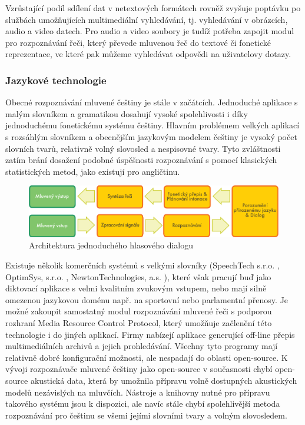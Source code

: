 \begin{multicols}{2}
Vzrůstající podíl sdílení dat v netextových formátech rovněž zvyšuje poptávku po službách umožňujících multimediální vyhledávání, tj. vyhledávání v obrázcích, audio a video datech. Pro audio a video soubory je tudíž potřeba zapojit modul pro rozpoznávání řeči, který převede mluvenou řeč do textové či fonetické reprezentace, ve které pak můžeme vyhledávat odpovědi na uživatelovy dotazy.

\subsubsection{Jazykové technologie}

Obecné rozpoznávání mluvené češtiny je stále v začátcích. Jednoduché aplikace s malým slovníkem a gramatikou dosahují vysoké spolehlivosti i díky jednoduchému fonetickému systému češtiny. Hlavním problémem velkých aplikací s rozsáhlým slovníkem a obecnějším jazykovým modelem češtiny je vysoký počet slovních tvarů, relativně volný slovosled a nespisovné tvary. Tyto zvláštnosti zatím brání dosažení podobné úspěšnosti rozpoznávání s pomocí klasických statistických metod, jako existují pro angličtinu.
\begin{figure}[htb]
  \center
  \includegraphics[width=\textwidth]{../_media/czech/simple_speech-based_dialogue_architecture}
  \caption{Architektura jednoduchého hlasového dialogu}
  \label{fig:dialoguearch_en}
\end{figure}
Existuje několik komerčních systémů s velkými slovníky (SpeechTech s.r.o. \cite{Note11}, OptimSys, s.r.o. \cite{Note12}, NewtonTechnologies, a.s. \cite{Note13}), které však pracují buď jako diktovací aplikace s velmi kvalitním zvukovým vstupem, nebo mají silně omezenou jazykovou doménu např. na sportovní nebo parlamentní přenosy. Je možné zakoupit samostatný modul rozpoznávání mluvené řeči s podporou rozhraní Media Resource Control Protocol, který umožňuje začlenění této technologie i do jiných aplikací. Firmy nabízejí aplikace generující off-line přepis multimediálních archivů a jejich prohledávání. Všechny tyto programy mají relativně dobré konfigurační možnosti, ale nespadají do oblasti open-source. K vývoji rozpoznávače mluvené češtiny jako open-source v současnosti chybí open-source akustická data, která by umožnila přípravu volně dostupných akustických modelů nezávislých na mluvčích. Nástroje a knihovny nutné pro přípravu takového systému jsou k dispozici, ale navíc stále chybí spolehlivější metoda rozpoznávání pro češtinu se všemi jejími slovními tvary a volným slovosledem.\\

\end{multicols}
